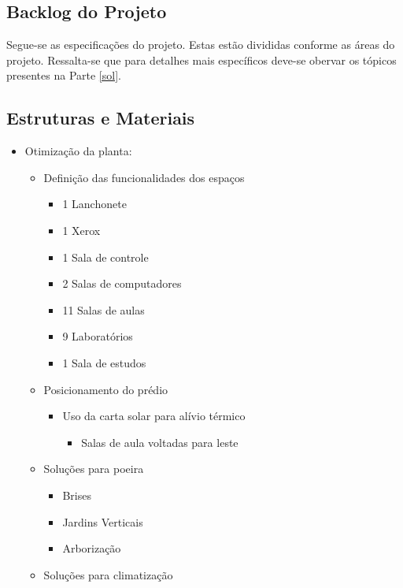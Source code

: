 \begin{apendicesenv}

\partapendices
\chapter{Backlog do Projeto}
\label{appendix:apdcA}

Segue-se as especificações do projeto. Estas estão divididas conforme as áreas do projeto. Ressalta-se que
 para detalhes mais específicos deve-se obervar os tópicos presentes na Parte \ref{sol}.

\section{Estruturas e Materiais}
  \begin{itemize}
    \item Otimização da planta:
    \begin{itemize}
      \item Definição das funcionalidades dos espaços
      \begin{itemize}
      \item 1 Lanchonete
      \item 1 Xerox
      \item 1 Sala de controle
      \item 2 Salas de computadores
      \item 11 Salas de aulas
      \item 9 Laboratórios
      \item 1 Sala de estudos
      \end{itemize}
      \item Posicionamento do prédio
      \begin{itemize}
      \item Uso da carta solar para alívio térmico
      \begin{itemize}
      \item Salas de aula voltadas para leste
      \end{itemize}
      \end{itemize}
      \item Soluções para poeira
      \begin{itemize}
      \item Brises
      \item Jardins Verticais
      \item Arborização
      \end{itemize}
      \item Soluções para climatização

\end{itemize}
\end{itemize}
\end{apendicesenv}

